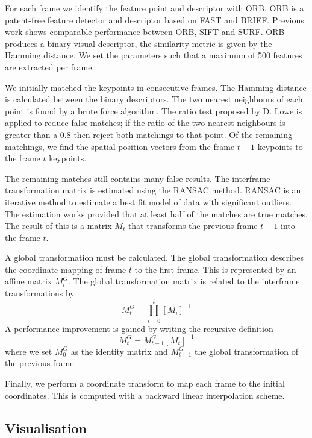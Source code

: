 For each frame we identify the feature point and descriptor with ORB.
ORB is a patent-free feature detector and descriptor based on FAST and BRIEF\cite{Rublee2011}.
Previous work shows comparable performance between ORB, SIFT and SURF\cite{Karami2017}.
ORB produces a binary visual descriptor,
the similarity metric is given by the Hamming distance.
We set the parameters such that a maximum of 500 features are extracted per frame.

We initially matched the keypoints in consecutive frames.
The Hamming distance is calculated between the binary descriptors.
The two nearest neighbours of each point is found by a brute force algorithm.
The ratio test proposed by D. Lowe\cite{Lowe2004} is applied to reduce false matches;
if the ratio of the two nearest neighbours is greater than a 0.8 then reject both matchings to that point.
Of the remaining matchings, we find the spatial position vectors from the frame $t-1$ keypoints to the frame $t$ keypoints.

The remaining matches still contains many false results.
The interframe transformation matrix is estimated using the RANSAC method\cite{Fischler1981}.
RANSAC is an iterative method to estimate a best fit model of data with significant outliers.
The estimation works provided that at least half of the matches are true matches.
The result of this is a matrix $M_t$ that transforms the previous frame $t-1$ into the frame $t$.

A global transformation must be calculated.
The global transformation describes the coordinate mapping of frame $t$ to the first frame.
This is represented by an affine matrix $M^G_t$.
The global transformation matrix is related to the interframe transformations by
\begin{equation}
	M^G_t =  \prod^{t}_{i=0}[ M_i ]^{-1}
\end{equation}
A performance improvement is gained by writing the recursive definition
\begin{equation}
  M^G_t = M^G_{t-1}[M_t]^{-1}
\end{equation}
where we set $M^G_0$ as the identity matrix and $M^G_{t-1}$ the global transformation of the previous frame.

Finally, we perform a coordinate transform to map each frame to the initial coordinates.
This is computed with a backward linear interpolation scheme. 



\subsection{Visualisation}

